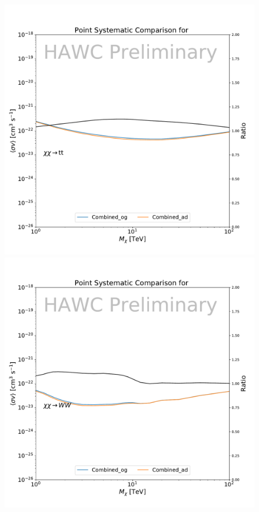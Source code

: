 \begin{figure}[h]
{    \includegraphics[scale=0.21]{figures/glory_duck/hawc/PointingSystematic_GD_Combined_tt.pdf}
    \includegraphics[scale=0.21]{figures/glory_duck/hawc/PointingSystematic_GD_Combined_ww.pdf}
}
\end{figure}

